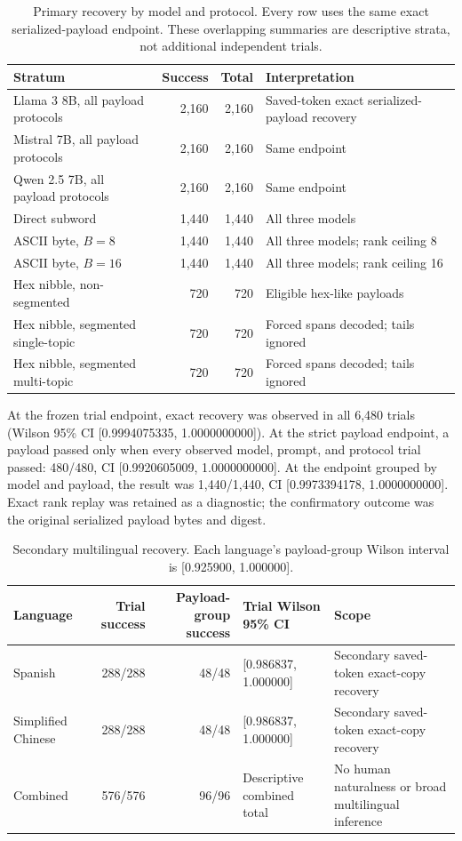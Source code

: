 \documentclass[fleqn,10pt]{wlscirep}
\begin{document}
\begin{table}[H]
\centering
\small
\begin{tabularx}{\textwidth}{L{0.28\textwidth}r r Y}
\toprule
Stratum & Success & Total & Interpretation \\
\midrule
Llama 3 8B, all payload protocols & 2,160 & 2,160 & Saved-token exact serialized-payload recovery \\
Mistral 7B, all payload protocols & 2,160 & 2,160 & Same endpoint \\
Qwen 2.5 7B, all payload protocols & 2,160 & 2,160 & Same endpoint \\
Direct subword & 1,440 & 1,440 & All three models \\
ASCII byte, \(B=8\) & 1,440 & 1,440 & All three models; rank ceiling 8 \\
ASCII byte, \(B=16\) & 1,440 & 1,440 & All three models; rank ceiling 16 \\
Hex nibble, non-segmented & 720 & 720 & Eligible hex-like payloads \\
Hex nibble, segmented single-topic & 720 & 720 & Forced spans decoded; tails ignored \\
Hex nibble, segmented multi-topic & 720 & 720 & Forced spans decoded; tails ignored \\
\bottomrule
\end{tabularx}
\caption{\label{tab:primary-strata}Primary recovery by model and protocol. Every row uses the same exact serialized-payload endpoint. These overlapping summaries are descriptive strata, not additional independent trials.}
\end{table}

At the frozen trial endpoint, exact recovery was observed in all 6,480 trials (Wilson 95\% CI [0.9994075335, 1.0000000000]). At the strict payload endpoint, a payload passed only when every observed model, prompt, and protocol trial passed: 480/480, CI [0.9920605009, 1.0000000000]. At the endpoint grouped by model and payload, the result was 1,440/1,440, CI [0.9973394178, 1.0000000000]. Exact rank replay was retained as a diagnostic; the confirmatory outcome was the original serialized payload bytes and digest.

\begin{table}[H]
\centering
\small
\begin{tabularx}{\textwidth}{L{0.22\textwidth}r r L{0.24\textwidth}Y}
\toprule
Language & Trial success & Payload-group success & Trial Wilson 95\% CI & Scope \\
\midrule
Spanish & 288/288 & 48/48 & [0.986837, 1.000000] & Secondary saved-token exact-copy recovery \\
Simplified Chinese & 288/288 & 48/48 & [0.986837, 1.000000] & Secondary saved-token exact-copy recovery \\
Combined & 576/576 & 96/96 & Descriptive combined total & No human naturalness or broad multilingual inference \\
\bottomrule
\end{tabularx}
\caption{\label{tab:multilingual}Secondary multilingual recovery. Each language's payload-group Wilson interval is [0.925900, 1.000000].}
\end{table}
\end{document}
